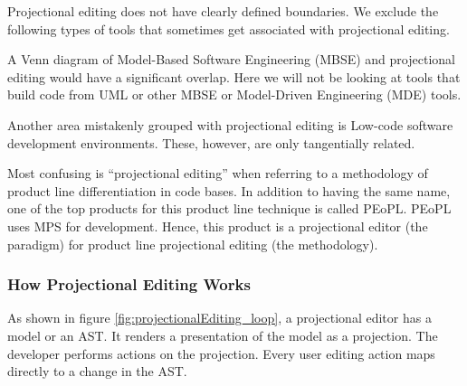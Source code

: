 Projectional editing does not have clearly defined boundaries.
We exclude the following types of tools that sometimes get associated with projectional editing.

A Venn diagram of Model-Based Software Engineering (MBSE) and projectional editing would have a significant overlap.
Here we will not be looking at tools that build code from UML or other MBSE or Model-Driven Engineering (MDE) tools.

Another area mistakenly grouped with projectional editing is Low-code software development environments.
These, however, are only tangentially related.

Most confusing is ``projectional editing'' when referring to a methodology of product line differentiation in code bases.
In addition to having the same name, one of the top products for this product line technique is called PEoPL.
PEoPL uses MPS for development.
Hence, this product is a projectional editor (the paradigm) for product line projectional editing (the methodology).

\subsubsection{How Projectional Editing Works}

As shown in figure \ref{fig:projectionalEditing_loop}, a projectional editor has a model or an AST.
It renders a presentation of the model as a projection.
The developer performs actions on the projection.
Every user editing action maps directly to a change in the AST.

